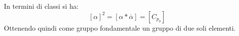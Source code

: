 \begin{itemize}
\begin{center}
		\end{center}
		In termini di classi si ha:
		\begin{equation*}
			\left[\alpha\right]^2=\left[\alpha\ast\overline{\alpha}\right]=\left[C_{p_0}\right]
		\end{equation*}
		Ottenendo quindi come gruppo fondamentale un gruppo di due soli elementi.
	\end{itemize}